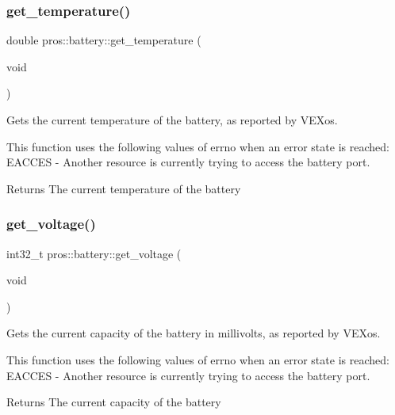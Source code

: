 \subsubsection{\texorpdfstring{get\+\_\+temperature()}{get\_temperature()}}
{\footnotesize\ttfamily double pros\+::battery\+::get\+\_\+temperature (\begin{DoxyParamCaption}\item[{void}]{ }\end{DoxyParamCaption})}



Gets the current temperature of the battery, as reported by V\+E\+Xos. 

This function uses the following values of errno when an error state is reached\+: E\+A\+C\+C\+ES -\/ Another resource is currently trying to access the battery port.

\begin{DoxyReturn}{Returns}
The current temperature of the battery 
\end{DoxyReturn}
\mbox{\label{namespacepros_1_1battery_a2c325b346f66c15ca7e5a844a66b20d9}} 
\subsubsection{\texorpdfstring{get\+\_\+voltage()}{get\_voltage()}}
{\footnotesize\ttfamily int32\+\_\+t pros\+::battery\+::get\+\_\+voltage (\begin{DoxyParamCaption}\item[{void}]{ }\end{DoxyParamCaption})}



Gets the current capacity of the battery in millivolts, as reported by V\+E\+Xos. 

This function uses the following values of errno when an error state is reached\+: E\+A\+C\+C\+ES -\/ Another resource is currently trying to access the battery port.

\begin{DoxyReturn}{Returns}
The current capacity of the battery 
\end{DoxyReturn}
